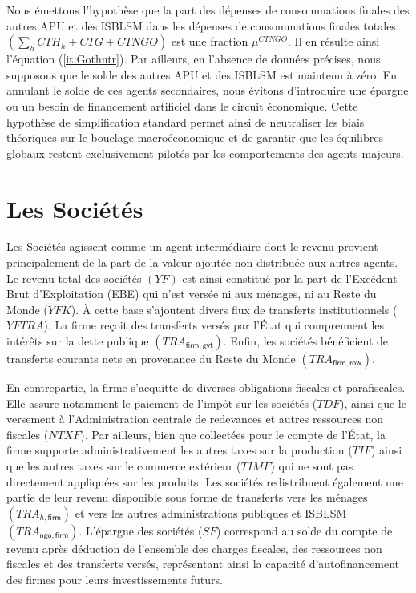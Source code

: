 \documentclass[11pt,a4paper]{article}
\newcommand{\firm}{\mathsf{firm}}
\newcommand{\gvt}{\mathsf{gvt}}
\newcommand{\ngo}{\mathsf{ngo}}
\newcommand{\row}{\mathsf{row}}
\newcommand{\CTG}{\mathit{CTG}}
\newcommand{\CTH}{\mathit{CTH}}
\newcommand{\CTNGO}{\mathit{CTNGO}}
\newcommand{\NTXF}{\mathit{NTXF}}
\newcommand{\SF}{\mathit{SF}}
\newcommand{\TDF}{\mathit{TDF}}
\newcommand{\TIF}{\mathit{TIF}}
\newcommand{\TIMF}{\mathit{TIMF}}
\newcommand{\TRA}{\mathit{TRA}}
\newcommand{\YF}{\mathit{YF}}
\newcommand{\YFK}{\mathit{YFK}}
\newcommand{\YFTR}{\mathit{YFTRA}}
\begin{document}
	Nous émettons l'hypothèse que la part des dépenses de consommations finales des autres APU et des ISBLSM dans les dépenses de consommations finales totales $\left(\sum_{h}\CTH_h + \CTG + \CTNGO\right)$ est une fraction $\mu^{\CTNGO}$. Il en résulte ainsi l'équation (\ref{it:Gothntr}). Par ailleurs, en l'absence de données précises, nous supposons que le solde des autres APU et des ISBLSM est maintenu à zéro. En annulant le solde de ces agents secondaires, nous évitons d'introduire une épargne ou un besoin de financement artificiel dans le circuit économique. Cette hypothèse de simplification standard permet ainsi de neutraliser les biais théoriques sur le bouclage macroéconomique et de garantir que les équilibres globaux restent exclusivement pilotés par les comportements des agents majeurs.
	
	\section{Les Sociétés}
	Les Sociétés agissent comme un agent intermédiaire dont le revenu provient principalement de la part de la valeur ajoutée non distribuée aux autres agents. Le revenu total des sociétés $\left(\YF\right)$ est ainsi constitué par la part de l'Excédent Brut d'Exploitation (EBE) qui n'est versée ni aux ménages, ni au Reste du Monde ($\YFK$). À cette base s'ajoutent divers flux de transferts institutionnels ($\YFTR$). La firme reçoit des transferts versés par l'État qui comprennent les intérêts sur la dette publique $\left(\TRA_{\firm,\gvt}\right)$. Enfin, les sociétés bénéficient de transferts courants nets en provenance du Reste du Monde $\left(\TRA_{\firm,\row}\right)$.
	
	En contrepartie, la firme s'acquitte de diverses obligations fiscales et parafiscales. Elle assure notamment le paiement de l'impôt sur les sociétés ($\TDF$), ainsi que le versement à l'Administration centrale de redevances et autres ressources non fiscales ($\NTXF$). Par ailleurs, bien que collectées pour le compte de l'État, la firme supporte administrativement les autres taxes sur la production ($\TIF$) ainsi que les autres taxes sur le commerce extérieur ($\TIMF$) qui ne sont pas directement appliquées sur les produits. Les sociétés redistribuent également une partie de leur revenu disponible sous forme de transferts vers les ménages $\left(\TRA_{h,\firm}\right)$ et vers les autres administrations publiques et ISBLSM $\left(\TRA_{\ngo,\firm}\right)$. L'épargne des sociétés ($\SF$) correspond au solde du compte de revenu après déduction de l'ensemble des charges fiscales, des ressources non fiscales et des transferts versés, représentant ainsi la capacité d'autofinancement des firmes pour leurs investissements futurs.
	
\end{document}
